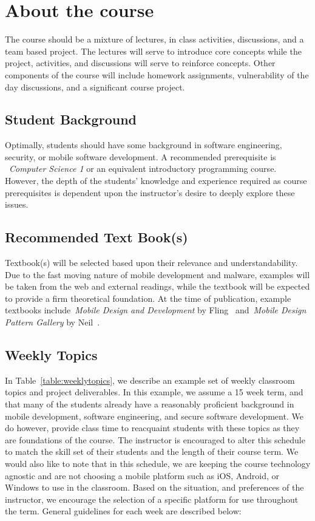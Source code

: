 \documentclass[conference]{IEEEtran}
\begin{document}
\label{sec: relatedwork}

\section{About the course}
\label{sec: aboutcourse}

The course should be a mixture of lectures, in class activities, discussions, and a team based project. The lectures will serve to introduce core concepts while the project, activities, and discussions will serve to reinforce concepts. Other components of the course will include homework assignments, vulnerability of the day discussions, and a significant course project.

\subsection{Student Background}

Optimally, students should have some background in software engineering, security, or mobile software development. A recommended prerequisite is ~\emph{Computer Science 1} or an equivalent introductory programming course. However, the depth of the students' knowledge and experience required as course prerequisites is dependent upon the instructor's desire to deeply explore these issues.

\subsection{Recommended Text Book(s)}
Textbook(s) will be selected based upon their relevance and understandability. Due to the fast moving nature of mobile development and malware, examples will be taken from the web and external readings, while the textbook will be expected to provide a firm theoretical foundation. At the time of publication, example textbooks include~\emph{Mobile Design and Development} by Fling~\cite{Fling:2009:MDD:1795492} and~\emph{Mobile Design Pattern Gallery} by Neil~\cite{neil2012mobile}.

\subsection{Weekly Topics}

In Table~\ref{table:weeklytopics}, we describe an example set of weekly classroom topics and project deliverables. In this example, we assume a 15 week term, and that many of the students already have a reasonably proficient background in mobile development, software engineering, and secure software development. We do however, provide class time to reacquaint students with these topics as they are foundations of the course.  The instructor is encouraged to alter this schedule to match the skill set of their students and the length of their course term. We would also like to note that in this schedule, we are keeping the course technology agnostic and are not choosing a mobile platform such as iOS, Android, or Windows to use in the classroom. Based on the situation, and preferences of the instructor, we encourage the selection of a specific platform for use throughout the term. General guidelines for each week are described below: \\
\end{document}
